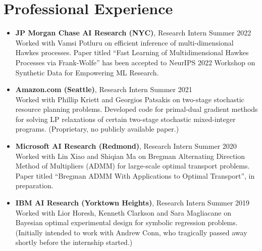 \documentclass[11pt]{article}
\begin{document}


\section*{\large Professional Experience}

\begin{itemize}

\item  {\bf JP Morgan Chase AI Research (NYC)}, {Research Intern} \hfill Summer 2022\\[1ex]
Worked with Vamsi Potluru on efficient %
inference of multi-dimensional Hawkes processes. Paper titled ``Fast Learning of Multidimensional Hawkes Processes via Frank-Wolfe'' has been accepted to NeurIPS 2022 Workshop on Synthetic Data for Empowering ML Research. 

\item  {\bf Amazon.com (Seattle)}, {Research Intern} \hfill Summer 2021\\[1ex]
Worked with Phillip Kriett and Georgios Patsakis on two-stage stochastic resource planning problems. Developed code for primal-dual gradient methods for solving LP relaxations of certain two-stage stochastic mixed-integer programs.  (Proprietary, no publicly available paper.)

\item  {\bf Microsoft AI Research (Redmond)}, {Research Intern} \hfill Summer 2020\\[1ex]
Worked with Lin Xiao and Shiqian Ma on %
Bregman Alternating Direction Method of Multipliers (ADMM) for large-scale optimal transport problems.  Paper titled ``Bregman ADMM With Applications to Optimal Transport'', in preparation. 

\newpage

\item  {\bf IBM AI Research (Yorktown Heights)}, {Research Intern} \hfill Summer 2019\\[1ex]
Worked with Lior Horesh, Kenneth Clarkson and Sara Magliacane on Bayesian optimal experimental design for symbolic regression problems. (Initially intended to work with Andrew Conn, who tragically passed away shortly before the internship started.)


\end{itemize}
\end{document}
